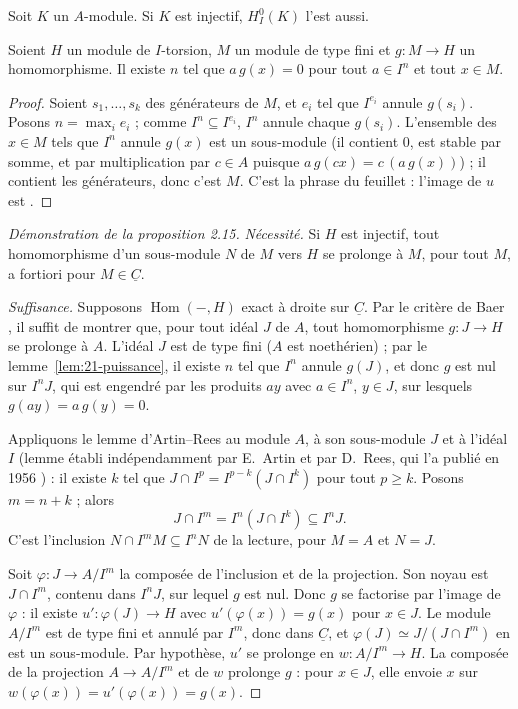 \begin{enonce}[Corollaire 2.16]
Soit $K$ un $A$-module. Si $K$ est injectif, $H^0_I(K)$ l'est aussi.
\end{enonce}

\begin{lemme}\label{lem:21-puissance}
Soient $H$ un module de $I$-torsion, $M$ un module de type fini et $g : M \to H$ un homomorphisme. Il existe $n$ tel que $a\,g(x) = 0$ pour tout $a \in I^n$ et tout $x \in M$.
\end{lemme}

\begin{proof}
Soient $s_1, \dots, s_k$ des générateurs de $M$, et $e_i$ tel que $I^{e_i}$ annule $g(s_i)$. Posons $n = \max_i e_i$ ; comme $I^n \subseteq I^{e_i}$, $I^n$ annule chaque $g(s_i)$. L'ensemble des $x \in M$ tels que $I^n$ annule $g(x)$ est un sous-module (il contient $0$, est stable par somme, et par multiplication par $c \in A$ puisque $a\,g(cx) = c\,(a\,g(x))$) ; il contient les générateurs, donc c'est $M$. C'est la phrase du feuillet : l'image de $u$ est .
\end{proof}

\begin{proof}[Démonstration de la proposition 2.15]
\emph{Nécessité.} Si $H$ est injectif, tout homomorphisme d'un sous-module $N$ de $M$ vers $H$ se prolonge à $M$, pour tout $M$, a fortiori pour $M \in \underline{C}$.

\emph{Suffisance.} Supposons $\operatorname{Hom}(-, H)$ exact à droite sur $\underline{C}$. Par le critère de Baer \cite{baer1940}, il suffit de montrer que, pour tout idéal $J$ de $A$, tout homomorphisme $g : J \to H$ se prolonge à $A$. L'idéal $J$ est de type fini ($A$ est noethérien) ; par le lemme~\ref{lem:21-puissance}, il existe $n$ tel que $I^n$ annule $g(J)$, et donc $g$ est nul sur $I^n J$, qui est engendré par les produits $a y$ avec $a \in I^n$, $y \in J$, sur lesquels $g(ay) = a\,g(y) = 0$.

Appliquons le lemme d'Artin--Rees au module $A$, à son sous-module $J$ et à l'idéal $I$ (lemme établi indépendamment par E.~Artin et par D.~Rees, qui l'a publié en 1956 \cite{rees1956}) : il existe $k$ tel que $J \cap I^{p} = I^{p-k}(J \cap I^{k})$ pour tout $p \geqslant k$. Posons $m = n + k$ ; alors
\[
  J \cap I^m = I^n (J \cap I^k) \subseteq I^n J .
\]
C'est l'inclusion $N \cap I^m M \subseteq I^n N$ de la lecture, pour $M = A$ et $N = J$.

Soit $\varphi : J \to A/I^m$ la composée de l'inclusion et de la projection. Son noyau est $J \cap I^m$, contenu dans $I^n J$, sur lequel $g$ est nul. Donc $g$ se factorise par l'image de $\varphi$ : il existe $u' : \varphi(J) \to H$ avec $u'(\varphi(x)) = g(x)$ pour $x \in J$. Le module $A/I^m$ est de type fini et annulé par $I^m$, donc dans $\underline{C}$, et $\varphi(J) \simeq J/(J \cap I^m)$ en est un sous-module. Par hypothèse, $u'$ se prolonge en $w : A/I^m \to H$. La composée de la projection $A \to A/I^m$ et de $w$ prolonge $g$ : pour $x \in J$, elle envoie $x$ sur $w(\varphi(x)) = u'(\varphi(x)) = g(x)$.
\end{proof}

